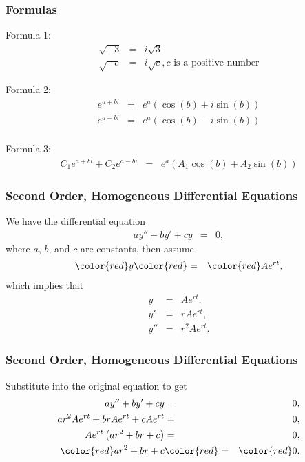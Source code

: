   
\begin{frame}
  \frametitle{Formulas} 
Formula 1:
  {\color{brown}
  \begin{eqnarray*}
  \sqrt{-3} & = & i\sqrt{3}\\
  \sqrt{-c} & = & i\sqrt{c}, c \text{ is a positive number}
  \end{eqnarray*}
  }

Formula 2: 
  {\color{red} 
  \begin{eqnarray*}
  e^{a+bi} & = & e^a (\cos(b) + i\sin(b))\\
  e^{a-bi} & = & e^a (\cos(b) - i\sin(b))\\
  \end{eqnarray*}
  }

Formula 3:
  {\color{blue} 
  \begin{eqnarray*}
  C_1 e^{a+bi} + C_2  e^{a-bi} & = & e^a (A_1\cos(b) + A_2\sin(b))
  \end{eqnarray*}
  }

\end{frame}

\begin{frame}
  \frametitle{Second Order, Homogeneous Differential Equations}

  We have the differential equation
  \begin{eqnarray*}
    a y'' + by' + cy & = & 0,
  \end{eqnarray*}
  where $a$, $b$, and $c$ are constants, then assume
  \begin{eqnarray*}
    {\color{red} y } & {\color{red} = } & {\color{red}A e^{rt}},
  \end{eqnarray*}
  which implies that
  \begin{eqnarray*}
    y   & = & A e^{rt}, \\
    y'  & = & r A e^{rt}, \\
    y'' & = & r^2 A e^{rt}.
  \end{eqnarray*}

\end{frame}

\begin{frame}
  \frametitle{Second Order, Homogeneous Differential Equations}

  Substitute into the original equation to get
  \begin{eqnarray*}
    a y'' + by' + cy & = & 0, \\
    a r^2 A e^{rt} + b r A e^{rt} + c A e^{rt} & = & 0, \\
    A e^{rt} \lp ar^2 + br + c \rp & = & 0, \\
    {\color{red} ar^2 + br + c } & {\color{red} = } & {\color{red} 0}.
  \end{eqnarray*}

\end{frame}


